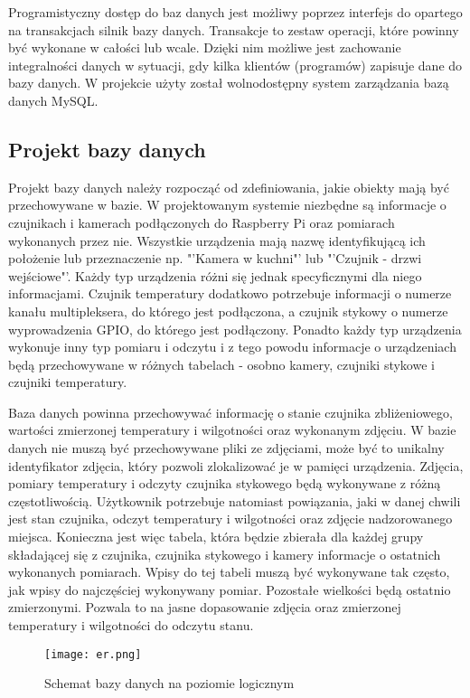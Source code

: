 \documentclass[a4paper,12pt,twoside]{article}
\begin{document}
Programistyczny dostęp do baz danych jest możliwy poprzez interfejs do opartego na transakcjach silnik bazy danych. Transakcje to zestaw operacji, które powinny być wykonane w całości lub wcale. Dzięki nim możliwe jest zachowanie integralności danych w sytuacji, gdy kilka klientów (programów) zapisuje dane do bazy danych. W projekcie użyty został wolnodostępny system zarządzania bazą danych MySQL.
\subsection{Projekt bazy danych}
Projekt bazy danych należy rozpocząć od zdefiniowania, jakie obiekty mają być przechowywane w bazie. W projektowanym systemie niezbędne są informacje o czujnikach i kamerach podłączonych do Raspberry Pi oraz pomiarach wykonanych przez nie. Wszystkie urządzenia mają nazwę identyfikującą ich położenie lub przeznaczenie np. "'Kamera w kuchni"' lub "'Czujnik - drzwi wejściowe"'. Każdy typ urządzenia różni się jednak specyficznymi dla niego informacjami. Czujnik temperatury dodatkowo potrzebuje informacji o numerze kanału multipleksera, do którego jest podłączona, a czujnik stykowy o numerze wyprowadzenia GPIO, do którego jest podłączony. Ponadto każdy typ urządzenia wykonuje inny typ pomiaru i odczytu i z tego powodu informacje o urządzeniach będą przechowywane w różnych tabelach - osobno kamery, czujniki stykowe i czujniki temperatury.

Baza danych powinna przechowywać informację o stanie czujnika zbliżeniowego, wartości zmierzonej temperatury i wilgotności oraz wykonanym zdjęciu. W bazie danych nie muszą być przechowywane pliki ze zdjęciami, może być to unikalny identyfikator zdjęcia, który pozwoli zlokalizować je w pamięci urządzenia. Zdjęcia, pomiary temperatury i odczyty czujnika stykowego będą wykonywane z różną częstotliwością. Użytkownik potrzebuje natomiast powiązania, jaki w danej chwili jest stan czujnika, odczyt temperatury i wilgotności oraz zdjęcie nadzorowanego miejsca. Konieczna jest więc tabela, która będzie zbierała dla każdej grupy składającej się z czujnika, czujnika stykowego i kamery informacje o ostatnich wykonanych pomiarach. Wpisy do tej tabeli muszą być wykonywane tak często, jak wpisy do najczęściej wykonywany pomiar. Pozostałe wielkości będą ostatnio zmierzonymi. Pozwala to na jasne dopasowanie zdjęcia oraz zmierzonej temperatury i wilgotności do odczytu stanu.

\begin{figure}[h]
\texttt{[image: er.png]}
\caption{Schemat bazy danych na poziomie logicznym}
\label{fig: er}
\end{figure}
\end{document}
